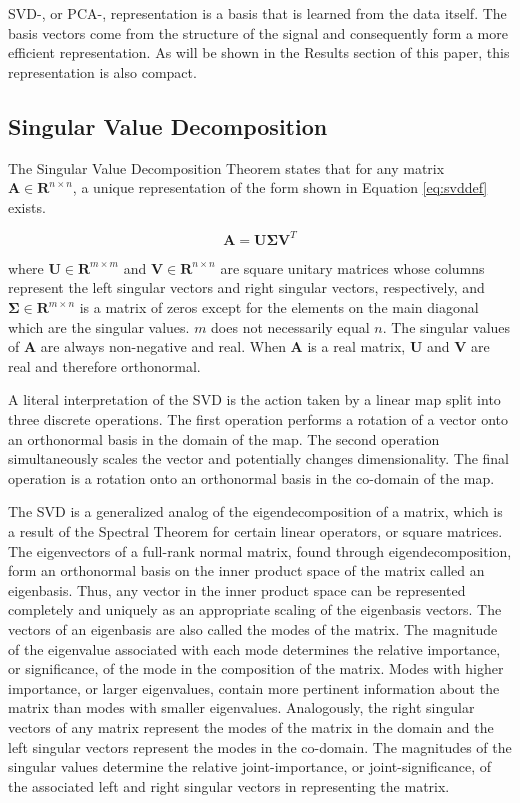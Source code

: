 \documentclass[conference]{IEEEtran}
\begin{document}
    SVD-, or PCA-, representation is a basis that is learned from the data itself. The basis vectors come from the structure of the signal and consequently form a more efficient representation. As will be shown in the Results section of this paper, this representation is also compact.
    
    \subsection{Singular Value Decomposition}
    The Singular Value Decomposition Theorem states that for any matrix $\mathbf{A} \in \mathbf{R}^{n \times n}$, a unique representation of the form shown in Equation \ref{eq:svddef} exists.

    \begin{equation}
        \mathbf{A} = \mathbf{U\Sigma }{\mathbf{V}^T}
    \label{eq:svddef}
    \end{equation}

    where $\mathbf{U} \in \mathbf{R}^{m \times m}$ and $\mathbf{V} \in \mathbf{R}^{n \times n}$ are square unitary
    matrices whose columns represent the left singular vectors and right singular vectors, respectively, and $\mathbf{\Sigma} \in \mathbf{R}^{m \times n}$ is a matrix of zeros except for the elements on the main diagonal which are the singular values. $m$ does not necessarily equal $n$. The singular values of $\mathbf{A}$ are always non-negative and real. When $\mathbf{A}$ is a real matrix, $\mathbf{U}$ and $\mathbf{V}$ are real and therefore orthonormal.

    A literal interpretation of the SVD is the action taken by a linear map split into three discrete operations. The first operation performs a rotation of a vector onto an orthonormal basis in the domain of the map. The second operation simultaneously scales the vector and potentially changes dimensionality. The final operation is a rotation onto an orthonormal basis in the co-domain of the map.

    The SVD is a generalized analog of the eigendecomposition of a matrix, which is a result of the Spectral Theorem for certain linear operators, or square matrices. The eigenvectors of a full-rank normal matrix, found through eigendecomposition, form an orthonormal basis on the inner product space of the matrix called an eigenbasis. Thus, any vector in the inner product space can be represented completely and uniquely as an appropriate scaling of the eigenbasis vectors. The vectors of an eigenbasis are also called the modes of the matrix. The magnitude of the eigenvalue associated with each mode determines the relative importance, or significance, of the mode in the composition of the matrix. Modes with higher importance, or larger eigenvalues, contain more pertinent information about the matrix than modes with smaller eigenvalues. Analogously, the right singular vectors of any matrix represent the modes of the matrix in the domain and the left singular vectors represent the modes in the co-domain. The magnitudes of the singular values determine the relative joint-importance, or joint-significance, of the associated left and right singular vectors in representing the matrix.
\end{document}
